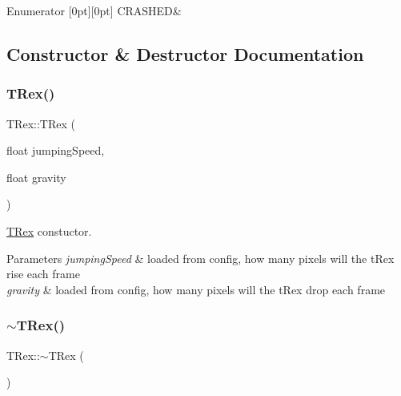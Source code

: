 \begin{DoxyEnumFields}{Enumerator}
[0pt][0pt]{}\mbox{\label{class_t_rex_a000c4d51b41f07886af073a6b7b3e063a41e6190dc9df5d761648b688111d8bcc}} 
C\+R\+A\+S\+H\+ED&\\
\hline

\end{DoxyEnumFields}


\subsection{Constructor \& Destructor Documentation}
\mbox{\label{class_t_rex_ae762432f9b24294e971b9f62191f26e9}} 
\subsubsection{\texorpdfstring{T\+Rex()}{TRex()}}
{\footnotesize\ttfamily T\+Rex\+::\+T\+Rex (\begin{DoxyParamCaption}\item[{float}]{jumping\+Speed,  }\item[{float}]{gravity }\end{DoxyParamCaption})}



\mbox{\hyperlink{class_t_rex}{T\+Rex}} constuctor. 


\begin{DoxyParams}{Parameters}
{\em jumping\+Speed} & loaded from config, how many pixels will the t\+Rex rise each frame \\
\hline
{\em gravity} & loaded from config, how many pixels will the t\+Rex drop each frame \\
\hline
\end{DoxyParams}
\mbox{\label{class_t_rex_a55dbaec9e6c442749133aaf017675c02}} 
\subsubsection{\texorpdfstring{$\sim$\+T\+Rex()}{~TRex()}}
{\footnotesize\ttfamily T\+Rex\+::$\sim$\+T\+Rex (\begin{DoxyParamCaption}{ }\end{DoxyParamCaption})}



